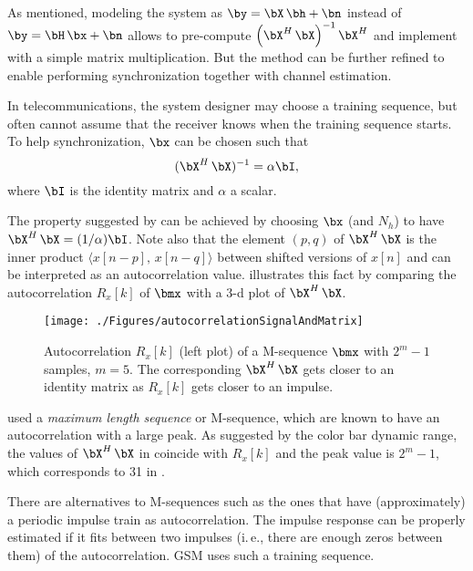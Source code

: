 As mentioned, modeling the system as $\by = \bX \, \bh + \bn$ instead of $\by = \bH \, \bx + \bn$ allows to pre-compute $\left( \bX^H \, \bX \right)^{-1}  \bX^H$ and implement  with a simple matrix multiplication. But the method can be further refined
to enable performing synchronization together with channel estimation.

In telecommunications, the system designer may choose a training sequence, but often cannot 
assume that the receiver knows when the training sequence starts. 
 To help synchronization, $\bx$ can be chosen such that 
\begin{equation}
(\bX^H \, \bX)^{-1}=\alpha \bI,
\label{eq:desiredAutocorrelationProperty}
\end{equation}
where $\bI$ is the identity matrix and $\alpha$ a scalar.

The property suggested by  can be 
achieved by choosing $\bx$ (and $N_h$) to have $\bX^H \, \bX=(1/\alpha) \bI$. Note also that
the element $(p,q)$ of $\bX^H \, \bX$ is the inner product $\langle x[n-p], \, x[n-q] \rangle$ between shifted versions of $x[n]$ and can be interpreted as an autocorrelation value.  illustrates this fact by comparing the autocorrelation $R_x[k]$ of $\bmx$ with a 3-d plot of $\bX^H \, \bX$. 

\begin{figure}[htbp]
\centering
\texttt{[image: ./Figures/autocorrelationSignalAndMatrix]}
\caption{Autocorrelation $R_x[k]$ (left plot) of a M-sequence $\bmx$ with $2^m-1$ samples, $m=5$. The corresponding $\bX^H \, \bX$ gets closer to an identity matrix as $R_x[k]$ gets closer to an impulse.\label{fig:autocorrelationSignalAndMatrix}}
\end{figure}

 used a \emph{maximum length sequence}   or M-sequence, which are known to have an autocorrelation with a large peak.
As suggested by the color bar dynamic range, the values of $\bX^H \, \bX$ in  coincide with $R_x[k]$ and the peak value is $2^m-1$, which corresponds to 31 in . 

There are alternatives to M-sequences such as the ones that have (approximately) a periodic impulse train as autocorrelation. The impulse response can be properly estimated if it fits between two impulses (i.\,e., there are enough zeros between them) of the autocorrelation. GSM uses such a training sequence.


